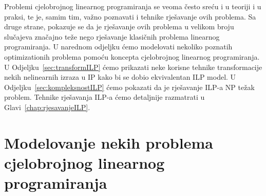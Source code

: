 \documentclass[b5paper, utf8, 11pt, colorlinks]{book}
\theoremstyle{definition}
\begin{document}
Problemi cjelobrojnog linearnog programiranja se veoma često sreću i u teoriji i u praksi, te je, samim tim, važno poznavati i tehnike rješavanje ovih problema. Sa druge strane, pokazuje se da je rješavanje ovih problema u velikom broju slučajeva značajno teže nego rješavanje klasičnih problema linearnog programiranja. U narednom odjeljku ćemo modelovati nekoliko poznatih optimizationih problema pomoću koncepta cjelobrojnog linearnog programiranja. U Odjeljku~\ref{sec:transformILP} ćemo prikazati neke korisne tehnike transformacije nekih nelinearnih izraza u IP kako bi se dobio ekvivalentan ILP model. U Odjeljku~\ref{sec:kompleksnostILP} ćemo pokazati da je rješavanje ILP-a NP težak problem. Tehnike rješavanja ILP-a ćemo detaljnije razmatrati u Glavi~\ref{chap:rjesavanjeILP}.
\section{Modelovanje nekih problema cjelobrojnog linearnog programiranja}
\end{document}
